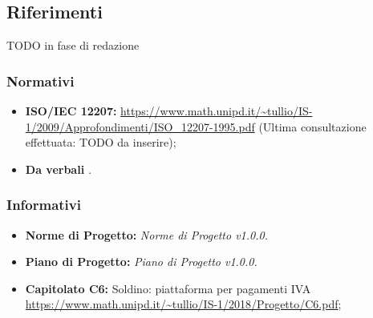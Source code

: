 \subsection{Riferimenti}

TODO in fase di redazione

\subsubsection{Normativi}
\begin{itemize}
	\item \textbf{ISO/IEC 12207:} \url{https://www.math.unipd.it/~tullio/IS-1/2009/Approfondimenti/ISO_12207-1995.pdf} (Ultima consultazione effettuata: TODO da inserire);
	\item \textbf{Da verbali} \emph{.}
\end{itemize}
\subsubsection{Informativi}
\begin{itemize}
	\item \textbf{Norme di Progetto:} \emph{Norme di Progetto v1.0.0.}
	\item \textbf{Piano di Progetto:} \emph{Piano di Progetto v1.0.0.}
	\item \textbf{Capitolato C6:} Soldino: piattaforma  per pagamenti IVA \\ \url{https://www.math.unipd.it/~tullio/IS-1/2018/Progetto/C6.pdf};
	
\end{itemize}
\pagebreak